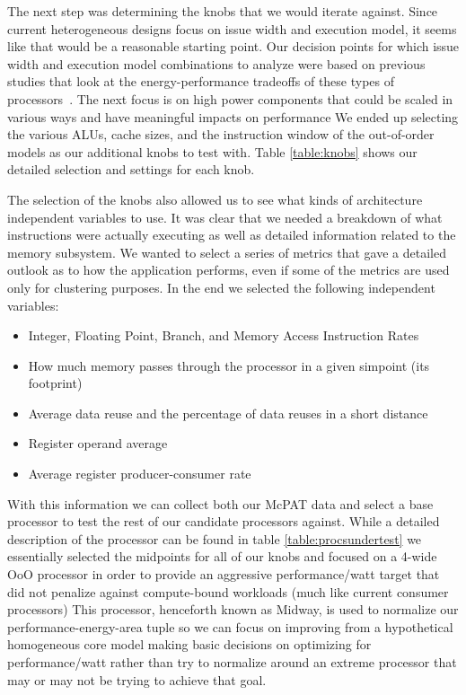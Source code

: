 The next step was determining the knobs that we would iterate against. Since
current heterogeneous designs focus on issue width and execution model, it seems
like that would be a reasonable starting point. Our decision points for which
issue width and execution model combinations to analyze were based on previous
studies that look at the energy-performance tradeoffs of these types of 
processors~\cite{horowitz}. The next focus is on high power components that 
could be scaled in various ways and have meaningful impacts on performance
We ended up selecting the various ALUs, cache sizes, and the instruction
window of the out-of-order models as our additional knobs to test with. 
Table \ref{table:knobs} shows our detailed selection and settings for each knob.

The selection of the knobs also allowed us to see what kinds of architecture
independent variables to use. It was clear that we needed a breakdown of 
what instructions were actually executing as well as detailed information
related to the memory subsystem. We wanted to select a series of metrics
that gave a detailed outlook as to how the application performs, even if
some of the metrics are used only for clustering purposes. In the end we 
selected the following independent variables: 

\begin{itemize}
\item Integer, Floating Point, Branch, and Memory Access Instruction Rates
\item How much memory passes through the processor in a given simpoint (its footprint)
\item Average data reuse and the percentage of data reuses in a short distance
\item Register operand average
\item Average register producer-consumer rate 
\end{itemize}

With this information we can collect both our McPAT data and select
a base processor to test the rest of our candidate processors against. While a detailed 
description of the processor can be found in table \ref{table:procsundertest}
we essentially selected the midpoints for all of our knobs and focused on a
4-wide OoO processor in order to provide an aggressive performance/watt target that
did not penalize against compute-bound workloads (much like current consumer processors)
This processor, henceforth known as Midway, is used to normalize our 
performance-energy-area tuple so we can focus on improving from a hypothetical
homogeneous core model making basic decisions on optimizing for performance/watt
rather than try to normalize around an extreme processor that may or may not be trying
to achieve that goal.

